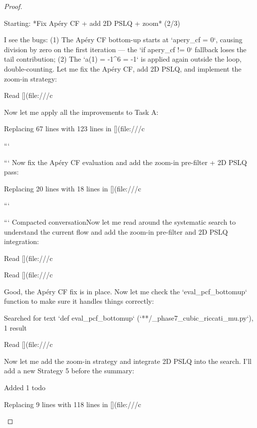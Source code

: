\begin{theorem}
\begin{lemma}
\begin{proposition}
\begin{corollary}
\begin{proof}
\begin{remark}
Starting: *Fix Apéry CF + add 2D PSLQ + zoom* (2/3)

I see the bugs: (1) The Apéry CF bottom-up starts at `apery_cf = 0`, causing division by zero on the first iteration — the `if apery_cf != 0` fallback loses the tail contribution; (2) The `a(1) = -1^6 = -1` is applied again outside the loop, double-counting. Let me fix the Apéry CF, add 2D PSLQ, and implement the zoom-in strategy:  

Read [](file:///c%

Now let me apply all the improvements to Task A: 

Replacing 67 lines with 123 lines in [](file:///c%


```

```
Now fix the Apéry CF evaluation and add the zoom-in pre-filter + 2D PSLQ pass:  

Replacing 20 lines with 18 lines in [](file:///c%


```

```
Compacted conversationNow let me read around the systematic search to understand the current flow and add the zoom-in pre-filter and 2D PSLQ integration: 

Read [](file:///c%

Read [](file:///c%

Good, the Apéry CF fix is in place. Now let me check the `eval_pcf_bottomup` function to make sure it handles things correctly: 

Searched for text `def eval_pcf_bottomup` (`**/_phase7_cubic_riccati_mu.py`), 1 result

Read [](file:///c%

Now let me add the zoom-in strategy and integrate 2D PSLQ into the search. I'll add a new Strategy 5 before the summary: 

Added 1 todo

Replacing 9 lines with 118 lines in [](file:///c%



\end{remark}
\end{proof}
\end{corollary}
\end{proposition}
\end{lemma}
\end{theorem}
